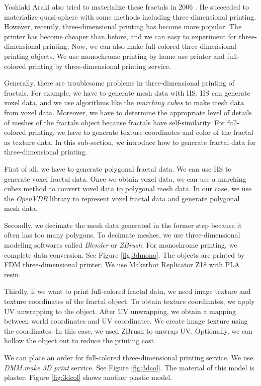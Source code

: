 \noindent Yoshiaki Araki also tried to materialize these fractals in 2006
\cite{araki2006materializing}.
He succeeded to materialize quasi-sphere with some methods including
three-dimensional printing.
However, recently, three-dimensional printing has become more popular.
The printer has become cheaper than before, and we can easy to
experiment for three-dimensional printing.
Now, we can also make full-colored three-dimensional printing objects.
We use monochrome printing by home use printer and full-colored
printing by three-dimensional printing service.

Generally, there are troublesome problems in three-dimensional printing of fractals.
For example, we have to generate mesh data with IIS.
IIS can generate voxel data, and we use algorithms like the \textit{marching
cubes} to make mesh data from voxel data.
Moreover, we have to determine the appropriate level of details of
meshes of the fractals object because fractals have self-similarity.
For full-colored printing, we have to generate texture coordinates and
color of the fractal as texture data.
In this sub-section, we introduce how to generate fractal data for
three-dimensional printing.

First of all, we have to generate polygonal fractal data.
We can use IIS to generate voxel fractal data.
Once we obtain voxel data, we can use a marching cubes method
to convert voxel data to polygonal mesh data.
In our case, we use the \textit{OpenVDB} library to represent voxel
fractal data and generate polygonal mesh data.

Secondly, we decimate the mesh data generated in the former step because
it often has too many polygons. 
To decimate meshes, we use three-dimensional modeling softwares called
\textit{Blender} or \textit{ZBrush}.
For monochrome printing, we complete data conversion.
See Figure \ref{fig:3dmono}.
The objects are printed by FDM three-dimensional printer. We use Makerbot
Replicator Z18 with PLA resin.

Thirdly, if we want to print full-colored fractal data, we need
image texture and texture coordinates of the fractal object.
To obtain texture coordinates, we apply UV unwrapping to the object.
After UV unwrapping, we obtain a mapping between world coordinates
and UV coordinates.
We create image texture using the coordinates. 
In this case, we used ZBrush to unwrap UV.
Optionally, we can hollow the object out to reduce the printing cost.

We can place an order for full-colored three-dimensional printing service.
We use \textit{DMM.make 3D print} service.
See Figure \ref{fig:3dcol}. The material of this model is plaster.
Figure \ref{fig:3dcol} shows another plastic model.

